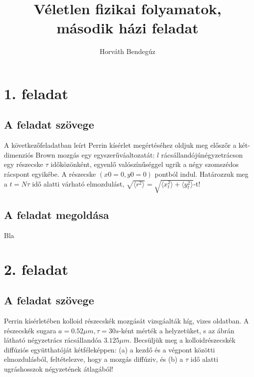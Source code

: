 \documentclass[12pt]{article}
\title{Véletlen fizikai folyamatok, második házi feladat}
\author{Horváth Bendegúz}
\begin{document}
\maketitle



\section*{1. feladat}

\subsection*{ A feladat szövege} A következőfeladatban leírt Perrin kísérlet megértéséhez oldjuk meg előszőr a két-dimenziós Brown mozgás
egy egyszerűváaltozatát: $l$ rácsállandójúnégyzetrácson egy részecske $\tau$ időközönként, egyenlő valószínűséggel ugrik a négy szomszédos rácspont egyikébe. A részecske $ (x0 = 0, y0 = 0)$ pontból indul.
Határozzuk meg a $t = N\tau $ idő alatti várható elmozdulást,  $\sqrt{\langle r^2 \rangle }= \sqrt{\langle x^2_t \rangle+ \langle y^2_t\rangle}$-t!

 
\subsection*{A feladat megoldása} Bla
 
\newpage
\section*{2. feladat}

\subsection*{ A feladat szövege}
Perrin kísérletében kolloid részecskék mozgását vizsgáalták híg, vizes oldatban. A részecskék sugara
$a = 0.52\mu m, \tau = 30s$-ként mérték a helyzetüket, s az ábrán látható négyzetrács rácsállandóa $3.125\mu m$. Becsüljük meg a kolloidrészecskék diffúziós együtthatóját kétféleképpen: (a) a kezdő és a végpont közötti elmozdulásból, feltételezve, hogy a mozgás diffúziv, és (b) a $\tau$ idő alatti ugráshosszok négyzetének átlagából!

 
\end{document}
